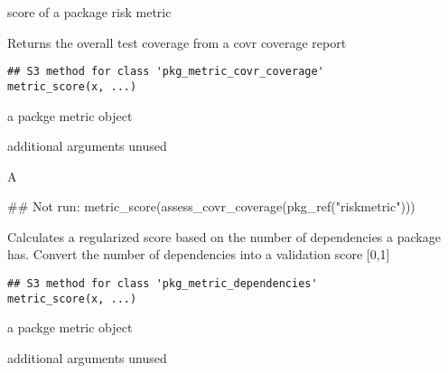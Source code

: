 \documentclass[a4paper]{book}
\begin{document}
%
\begin{Value}
score of a package risk metric
\end{Value}
%
\begin{Description}
Returns the overall test coverage from a covr coverage report
\end{Description}
%
\begin{Usage}
\begin{verbatim}
## S3 method for class 'pkg_metric_covr_coverage'
metric_score(x, ...)
\end{verbatim}
\end{Usage}
%
\begin{Arguments}
\begin{ldescription}
\item[\code{x}] a  packge metric object

\item[\code{...}] additional arguments unused
\end{ldescription}
\end{Arguments}
%
\begin{Value}
A 
\end{Value}
%
\begin{Examples}
\begin{ExampleCode}
## Not run: metric_score(assess_covr_coverage(pkg_ref("riskmetric")))

\end{ExampleCode}
\end{Examples}
%
\begin{Description}
Calculates a regularized score based on the number of dependencies a package has.
Convert the number of dependencies  into a validation
score [0,1] 
\end{Description}
%
\begin{Usage}
\begin{verbatim}
## S3 method for class 'pkg_metric_dependencies'
metric_score(x, ...)
\end{verbatim}
\end{Usage}
%
\begin{Arguments}
\begin{ldescription}
\item[\code{x}] a  packge metric object

\item[\code{...}] additional arguments unused
\end{ldescription}
\end{Arguments}
\end{document}
